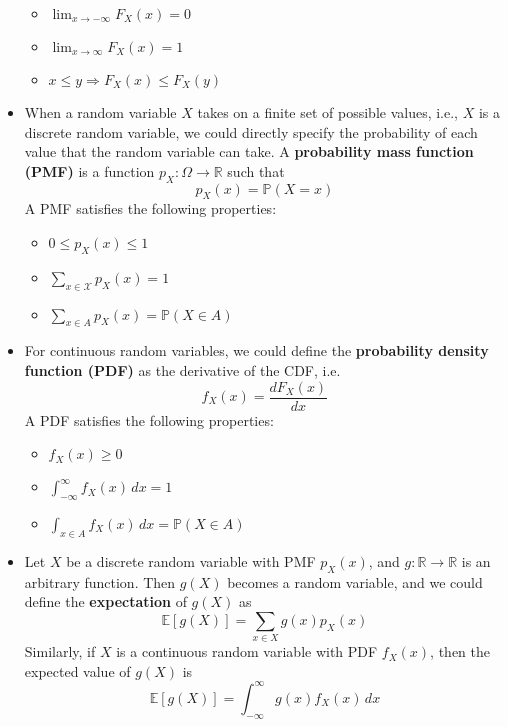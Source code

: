 \documentclass{article}
\begin{document}
\begin{itemize}
\begin{itemize}
        \item $\lim_{x \rightarrow -\infty} F_X(x) = 0$
        \item $\lim_{x \rightarrow \infty} F_X(x) = 1$
        \item $x \leq y \Rightarrow F_X(x) \leq F_X(y)$
    \end{itemize}
    \item When a random variable $X$ takes on a finite set of possible values, i.e., $X$ is a discrete random variable, we could directly specify the probability of each value that the random variable can take. A \textbf{probability mass function (PMF)} is a function $p_X : \Omega \rightarrow \mathbb{R}$ such that
    \begin{equation}
        p_X(x) = \mathbb{P}(X = x)
    \end{equation}
    A PMF satisfies the following properties:
    \begin{itemize}
        \item $0 \leq p_X(x) \leq 1$
        \item $\sum_{x \in \mathcal{X}} p_X(x) = 1$
        \item $\sum_{x \in A} p_X(x) = \mathbb{P}(X \in A)$
    \end{itemize}
    
    \item For continuous random variables, we could define the \textbf{probability density function (PDF)} as the derivative of the CDF, i.e.
    \begin{equation}
        f_X(x) = \frac{dF_X(x)}{dx}
    \end{equation}
    A PDF satisfies the following properties:
    \begin{itemize}
        \item $f_X(x) \geq 0$
        \item $\int_{-\infty}^{\infty} f_X(x)\,dx = 1$
        \item $\int_{x \in A} f_X(x)\,dx = \mathbb{P}(X \in A)$
    \end{itemize}
    
    \item Let $X$ be a discrete random variable with PMF $p_X(x)$, and $g : \mathbb{R} \rightarrow \mathbb{R}$ is an arbitrary function. Then $g(X)$ becomes a random variable, and we could define the \textbf{expectation} of $g(X)$ as
    \begin{equation}
        \mathbb{E}[g(X)] = \sum_{x \in X} g(x) p_X(x)
    \end{equation}
    Similarly, if $X$ is a continuous random variable with PDF $f_X(x)$, then the expected value of $g(X)$ is
    \begin{equation}
        \mathbb{E}[g(X)] = \int_{-\infty}^{\infty} g(x) f_X(x)\,dx
    \end{equation}
    

\end{itemize}
\end{document}
